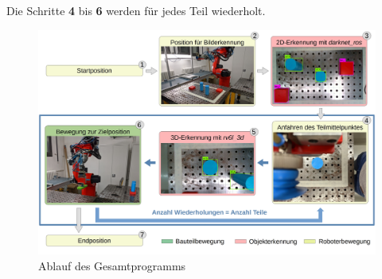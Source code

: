 Die Schritte \textbf{4} bis \textbf{6} werden für jedes Teil wiederholt.

\begin{figure}[ht]
    \centering
    \includegraphics[angle=90, width=12cm]{Bilder/gesamtsystem_ablauf.jpg}
    \caption{Ablauf des Gesamtprogramms}
    \label{fig:gesamtsystem_ablauf}
\end{figure}